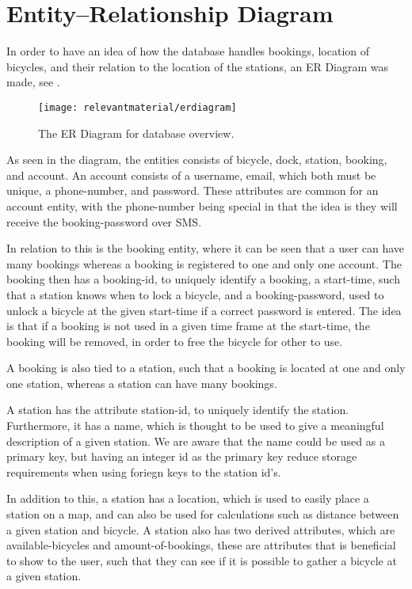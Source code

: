 \section{Entity--Relationship Diagram}\label{sec:ERdiagram}
In order to have an idea of how the database handles bookings, location of bicycles, and their relation to the location of the stations, an ER Diagram was made, see .

\begin{figure}
	\centering
	\texttt{[image: relevantmaterial/erdiagram]}
	\caption{The ER Diagram for database overview.}\label{fig:er-dia}
\end{figure}

As seen in the diagram, the entities consists of bicycle, dock, station, booking, and account.
An account consists of a username, email, which both must be unique, a phone-number, and password.
These attributes are common for an account entity, with the phone-number being special in that the idea is they will receive the booking-password over SMS.

In relation to this is the booking entity, where it can be seen that a user can have many bookings whereas a booking is registered to one and only one account.
The booking then has a booking-id, to uniquely identify a booking, a start-time, such that a station knows when to lock a bicycle, and a booking-password, used to unlock a bicycle at the given start-time if a correct password is entered.
The idea is that if a booking is not used in a given time frame at the start-time, the booking will be removed, in order to free the bicycle for other to use.

A booking is also tied to a station, such that a booking is located at one and only one station, whereas a station can have many bookings.

A station has the attribute station-id, to uniquely identify the station.
Furthermore, it has a name, which is thought to be used to give a meaningful description of a given station.
We are aware that the name could be used as a primary key, but having an integer id as the primary key reduce storage requirements when using foriegn keys to the station id's.

In addition to this, a station has a location, which is used to easily place a station on a map, and can also be used for calculations such as distance between a given station and bicycle.
A station also has two derived attributes, which are available-bicycles and amount-of-bookings, these are attributes that is beneficial to show to the user, such that they can see if it is possible to gather a bicycle at a given station.

